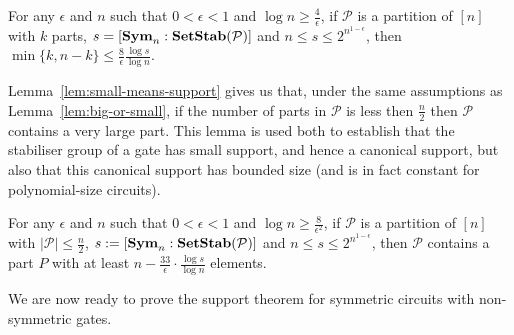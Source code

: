 \documentclass[../paper.tex]{subfiles}
\begin{document}
\begin{lem}
  \label{lem:big-or-small}
  For any $\epsilon$ and $n$ such that $0 < \epsilon < 1$ and $\log n \geq
  \frac{4}{\epsilon}$, if $\mathcal{P}$ is a partition of $[n]$ with $k$ parts,
  $s = [\text{\textbf{Sym}}_n : \text{\textbf{SetStab}} (\mathcal{P})]$ and $n \leq s \leq
  2^{n^{1-\epsilon}}$, then $\min \{k, n-k\} \leq \frac{8}{\epsilon} \frac{\log
    s}{\log n}$.
\end{lem}

Lemma~\ref{lem:small-means-support} gives us that, under the same assumptions as
Lemma~\ref{lem:big-or-small}, if the number of parts in $\mathcal{P}$ is less
then $\frac{n}{2}$ then $\mathcal{P}$ contains a very large part. This lemma is
used both to establish that the stabiliser group of a gate has small support,
and hence a canonical support, but also that this canonical support has bounded
size (and is in fact constant for polynomial-size circuits).

\begin{lem}
  \label{lem:small-means-support}
  For any $\epsilon$ and $n$ such that $0 < \epsilon < 1$ and $\log n \geq
  \frac{8}{\epsilon^2}$, if $\mathcal{P}$ is a partition of $[n]$ with $\vert
  \mathcal{P} \vert \leq \frac{n}{2}$, $s:= [\text{\textbf{Sym}}_n : \text{\textbf{SetStab}} (\mathcal{P})]$
  and $n \leq s \leq 2^{n^{1-\epsilon}}$, then $\mathcal{P}$ contains a part $P$
  with at least $n - \frac{33}{\epsilon} \cdot \frac{\log s} {\log n}$ elements.
\end{lem}


We are now ready to prove the support theorem for symmetric circuits
with non-symmetric gates.
\end{document}
